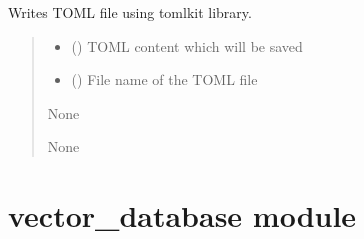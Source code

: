 \documentclass[letterpaper,10pt,english]{sphinxmanual}
\begin{document}
\begin{fulllineitems}
\label{\detokenize{toml_report_utils:toml_report_utils.write_report_tomlkit}}
\pysigstartsignatures
\pysiglinewithargsret
{}
{\sphinxparamcomma {}}
{}
\pysigstopsignatures
\sphinxAtStartPar
Writes TOML file using tomlkit library.
\begin{quote}\begin{description}
\begin{itemize}
\item {} 
\sphinxAtStartPar
{} () \textendash{} TOML content which will be saved

\item {} 
\sphinxAtStartPar
{} () \textendash{} File name of the TOML file

\end{itemize}

\sphinxAtStartPar
None

\sphinxAtStartPar
None

\end{description}\end{quote}

\end{fulllineitems}


\sphinxstepscope


\section{vector\_database module}
\label{\detokenize{vector_database:module-vector_database}}\label{\detokenize{vector_database:vector-database-module}}\label{\detokenize{vector_database::doc}}
\end{document}
